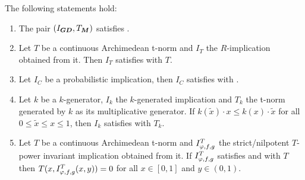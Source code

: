 \begin{proposition}\label{prop:(MTC)} 
The following statements hold:
	\begin{enumerate}[label=(\roman*)]
		\item The pair $(I_{\bm{GD}}, T_{\bm{M}})$ satisfies \MTC.
		\item Let $T$ be a continuous Archimedean t-norm and $I_T$ the $R$-implication obtained from it. Then $I_T$ satisfies \MTC with $T$.
		\item Let $I_C$ be a probabilistic implication, then $I_C$ satisfies \MTC with \TP.
		\item  Let $k$ be a $k$-generator, $I_k$ the $k$-generated implication and $T_k$ the t-norm generated by $k$ as its multiplicative generator. If $k(\tilde{x}) \cdot x \leq k(x) \cdot \tilde{x}$ for all $0\leq \tilde{x} \leq x \leq 1$, then $I_k$ satisfies \MTC with $T_k$.
		\item Let $T$ be a continuous Archimedean t-norm and $I^T_{\varphi,f,g}$ the strict/nilpotent $T$-power invariant implication obtained from it. If $I^T_{\varphi,f,g}$ satisfies \TC and \MTC with $T$ then $T(x,I^T_{\varphi,f,g}(x,y))=0$ for all $x \in [0,1]$ and $y \in (0,1)$.
	\end{enumerate}
\end{proposition}

